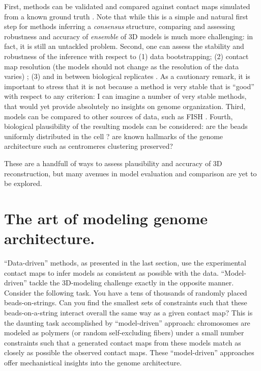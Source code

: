 \documentclass[2columns]{article}
\begin{document}
First, methods can be validated and compared against contact maps simulated
from a known ground truth \citep{zhang:inference, varoquaux:statistical,
lesne:3d, trieu:3D}. Note that while this is a simple and natural first step
for methods inferring a \textit{consensus} structure, comparing and assessing
robustness and accuracy of {\em ensemble} of 3D models is much more
challenging: in fact, it is still an untackled problem. Second, one can assess
the stability and robustness of the inference with respect to (1) data
bootstrapping; (2) contact map resolution (the models should not change as the
resolution of the data varies) \citep{zhang:inference, varoquaux:statistical};
(3) and in between biological replicates \citep{zhang:inference,
varoquaux:statistical}. As a cautionary remark, it is important to stress that
it is not because a method is very stable that is ``good'' with respect to any
criterion: I can imagine a number of very stable methods, that would yet
provide absolutely no insights on genome organization. Third, models can be
compared to other sources of data, such as FISH
\citep{ay:three-dimensional,duan:three-dimensional}. Fourth, biological
plausibility of the resulting models can be considered: are the beads
uniformly distributed in the cell \citep{ay:three-dimensional}? are known
hallmarks of the genome architecture such as centromeres clustering preserved?

These are a handfull of ways to assess plausibility and accuracy of 3D
reconstruction, but many avenues in model evaluation and comparison are yet to
be explored.

\section*{The art of modeling genome architecture.}

``Data-driven'' methods, as presented in the last section, use the
experimental contact maps to infer models as consistent as possible with the
data. ``Model-driven'' tackle the 3D-modeling challenge exactly in the
opposite manner. Consider the following task. You have a tens of thousands of
randomly placed beads-on-strings. Can you find the smallest sets of
constraints such that these beads-on-a-string interact overall the same way as
a given contact map? This is the daunting task accomplished by
``model-driven'' approach: chromosomes are modeled as polymers (or random
self-excluding fibers) under a small number constraints such that a generated
contact maps from these models match as closely as possible the observed
contact maps. These ``model-driven'' approaches offer mechanistical insights
into the genome architecture.
\end{document}
